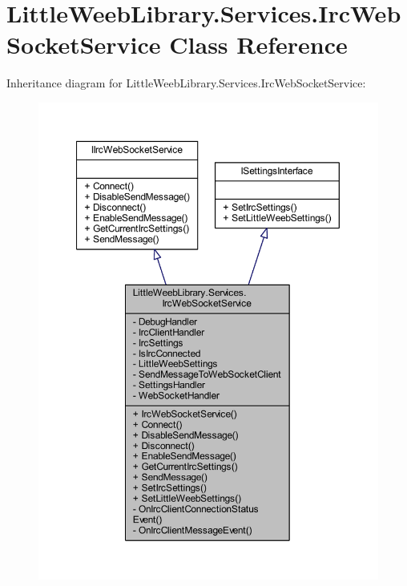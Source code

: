 \hypertarget{class_little_weeb_library_1_1_services_1_1_irc_web_socket_service}{}\section{Little\+Weeb\+Library.\+Services.\+Irc\+Web\+Socket\+Service Class Reference}
\label{class_little_weeb_library_1_1_services_1_1_irc_web_socket_service}


Inheritance diagram for Little\+Weeb\+Library.\+Services.\+Irc\+Web\+Socket\+Service\+:\nopagebreak
\begin{figure}[H]
\begin{center}
\leavevmode
\includegraphics[width=350pt]{class_little_weeb_library_1_1_services_1_1_irc_web_socket_service__inherit__graph}
\end{center}
\end{figure}


